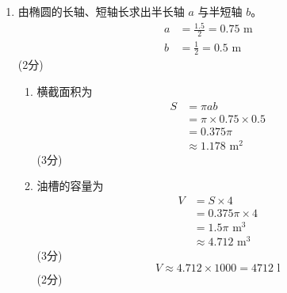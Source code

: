 \documentclass[12pt,a4paper]{exam-zh}
\newcommand{\solutionlayout}{%
    \setlength{\abovedisplayskip}{0.6em}%
    \setlength{\belowdisplayskip}{0.6em}%
    \setlength{\abovedisplayshortskip}{0.35em}%
    \setlength{\belowdisplayshortskip}{0.35em}%
    \setlength{\jot}{0.35em}%
}
\begin{document}
\begin{solution}
    \solutionlayout
    \begin{enumerate}[label=(\alph*),leftmargin=2.4em,itemsep=1em,topsep=0.5em,parsep=0.25em]
        \item
        由椭圆的长轴、短轴长求出半长轴 $a$ 与半短轴 $b$。
        \begin{align*}
            a &= \frac{1.5}{2} = 0.75 \text{ m} \\
            b &= \frac{1}{2} = 0.5 \text{ m}
        \end{align*}
        \hfill (2分)
        \begin{enumerate}[label=(\roman*),leftmargin=2.2em,itemsep=0.7em,topsep=0.35em]
            \item 横截面积为
            \begin{align*}
                S &= \pi ab \\
                &= \pi \times 0.75 \times 0.5 \\
                &= 0.375\pi \\
                &\approx 1.178 \text{ m}^2
            \end{align*}
            \hfill (3分)

            \item 油槽的容量为
            \begin{align*}
                V &= S \times 4 \\
                &= 0.375\pi \times 4 \\
                &= 1.5\pi \text{ m}^3 \\
                &\approx 4.712 \text{ m}^3
            \end{align*}
            \hfill (3分)
            \[
                V \approx 4.712 \times 1000 = 4712 \text{ l}
            \]
            \hfill (2分)
        \end{enumerate}


\end{enumerate}
\end{solution}
\end{document}
